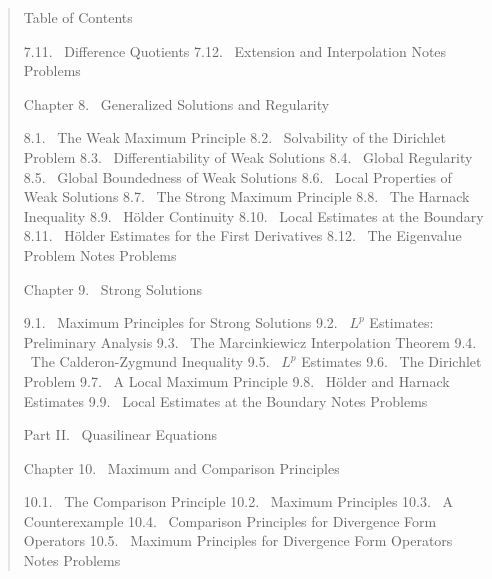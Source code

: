 \begin{quote}
Table of Contents

7.11. \ Difference Quotients 
7.12. \ Extension and Interpolation 
Notes 
Problems 

Chapter 8. \ Generalized Solutions and Regularity 

8.1. \ The Weak Maximum Principle 
8.2. \ Solvability of the Dirichlet Problem 
8.3. \ Differentiability of Weak Solutions 
8.4. \ Global Regularity 
8.5. \ Global Boundedness of Weak Solutions 
8.6. \ Local Properties of Weak Solutions 
8.7. \ The Strong Maximum Principle 
8.8. \ The Harnack Inequality 
8.9. \ Hölder Continuity 
8.10. \ Local Estimates at the Boundary 
8.11. \ Hölder Estimates for the First Derivatives 
8.12. \ The Eigenvalue Problem 
Notes 
Problems 

Chapter 9. \ Strong Solutions 

9.1. \ Maximum Principles for Strong Solutions 
9.2. \ $L^p$ Estimates: Preliminary Analysis 
9.3. \ The Marcinkiewicz Interpolation Theorem 
9.4. \ The Calderon-Zygmund Inequality 
9.5. \ $L^p$ Estimates 
9.6. \ The Dirichlet Problem 
9.7. \ A Local Maximum Principle 
9.8. \ Hölder and Harnack Estimates 
9.9. \ Local Estimates at the Boundary 
Notes 
Problems 

Part II. \ Quasilinear Equations

Chapter 10. \ Maximum and Comparison Principles 

10.1. \ The Comparison Principle 
10.2. \ Maximum Principles 
10.3. \ A Counterexample 
10.4. \ Comparison Principles for Divergence Form Operators 
10.5. \ Maximum Principles for Divergence Form Operators 
Notes 
Problems 
\end{quote}


